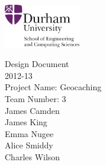 \newcommand{\authorline}[1]{{\LARGE #1}\\[1cm]}

\begin{titlepage}
\begin{flushright}
\includegraphics[width=0.25\textwidth]{logo}~\\[2cm]
\end{flushright}

\begin{center}
{\Huge Design Document} \\
[1cm]

{\Huge 2012-13} \\
[1cm]

{\Huge Project Name: Geocaching} \\
[2cm]

{\huge Team Number: 3} \\
[1cm]

\authorline{James Camden}

\authorline{James King}

\authorline{Emma Nugee}

\authorline{Alice Smiddy}

\authorline{Charles Wilson}
\end{center}
\end{titlepage}
